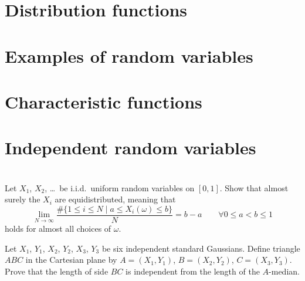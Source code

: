 \section{Distribution functions}

\section{Examples of random variables}

\section{Characteristic functions}

\section{Independent random variables}

\section{\problemhead}
\begin{problem}
	[Equidistribution]
	Let $X_1$, $X_2$, \dots\ be i.i.d.\ uniform random variables on $[0,1]$.
	Show that almost surely the $X_i$ are equidistributed,
	meaning that
	\[ \lim_{N \to \infty} \frac{ \# \{1 \le i \le N \mid a \le X_i(\omega) \le b \}}{N}
		= b-a \qquad \forall 0 \le a < b \le 1 \]
	holds for almost all choices of $\omega$.
\end{problem}

\begin{problem}
	Let $X_1$, $Y_1$, $X_2$, $Y_2$, $X_3$, $Y_3$
	be six independent standard Gaussians.
	Define triangle $ABC$ in the Cartesian plane
	by $A = (X_1,Y_1)$, $B = (X_2,Y_2)$, $C = (X_3,Y_3)$.
	Prove that the length of side $BC$
	is independent from the length of the $A$-median.
\end{problem}

